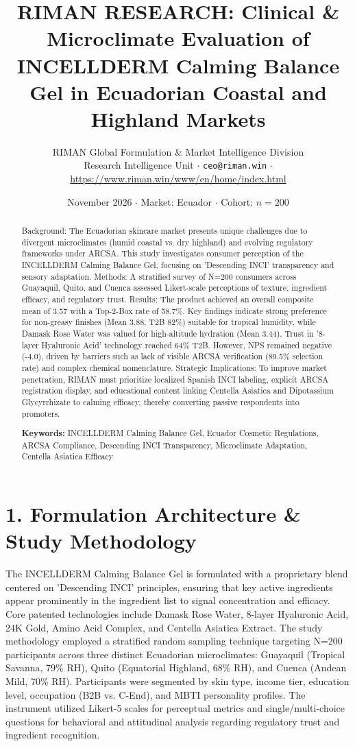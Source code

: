 \documentclass[10pt,twocolumn,a4paper]{article}
\title{\textbf{RIMAN RESEARCH: Clinical \& Microclimate Evaluation of INCELLDERM Calming Balance Gel in Ecuadorian Coastal and Highland Markets}}
\author{RIMAN Global Formulation \& Market Intelligence Division\\
\small Research Intelligence Unit $\cdot$ \texttt{ceo@riman.win} $\cdot$ \url{https://www.riman.win/www/en/home/index.html}}
\date{November 2026 \quad $\cdot$ \quad Market: Ecuador \quad $\cdot$ \quad Cohort: $n = 200$}
\begin{document}
\maketitle

\begin{abstract}
Background: The Ecuadorian skincare market presents unique challenges due to divergent microclimates (humid coastal vs. dry highland) and evolving regulatory frameworks under ARCSA. This study investigates consumer perception of the INCELLDERM Calming Balance Gel, focusing on 'Descending INCI' transparency and sensory adaptation. Methods: A stratified survey of N=200 consumers across Guayaquil, Quito, and Cuenca assessed Likert-scale perceptions of texture, ingredient efficacy, and regulatory trust. Results: The product achieved an overall composite mean of 3.57 with a Top-2-Box rate of 58.7\%. Key findings indicate strong preference for non-greasy finishes (Mean 3.88, T2B 82\%) suitable for tropical humidity, while Damask Rose Water was valued for high-altitude hydration (Mean 3.44). Trust in '8-layer Hyaluronic Acid' technology reached 64\% T2B. However, NPS remained negative (-4.0), driven by barriers such as lack of visible ARCSA verification (89.5\% selection rate) and complex chemical nomenclature. Strategic Implications: To improve market penetration, RIMAN must prioritize localized Spanish INCI labeling, explicit ARCSA registration display, and educational content linking Centella Asiatica and Dipotassium Glycyrrhizate to calming efficacy, thereby converting passive respondents into promoters.

\vspace{0.4em}
\noindent\textbf{Keywords:} INCELLDERM Calming Balance Gel, Ecuador Cosmetic Regulations, ARCSA Compliance, Descending INCI Transparency, Microclimate Adaptation, Centella Asiatica Efficacy
\end{abstract}

\section{1. Formulation Architecture \& Study Methodology}
The INCELLDERM Calming Balance Gel is formulated with a proprietary blend centered on 'Descending INCI' principles, ensuring that key active ingredients appear prominently in the ingredient list to signal concentration and efficacy. Core patented technologies include Damask Rose Water, 8-layer Hyaluronic Acid, 24K Gold, Amino Acid Complex, and Centella Asiatica Extract. The study methodology employed a stratified random sampling technique targeting N=200 participants across three distinct Ecuadorian microclimates: Guayaquil (Tropical Savanna, 79\% RH), Quito (Equatorial Highland, 68\% RH), and Cuenca (Andean Mild, 70\% RH). Participants were segmented by skin type, income tier, education level, occupation (B2B vs. C-End), and MBTI personality profiles. The instrument utilized Likert-5 scales for perceptual metrics and single/multi-choice questions for behavioral and attitudinal analysis regarding regulatory trust and ingredient recognition.
\end{document}
